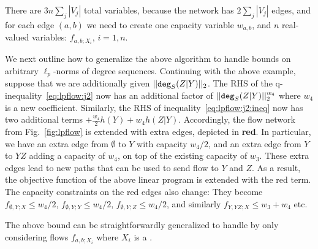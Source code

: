 \begin{example}
There are $3n\sum_j |V_j|$ total variables, because the network has
$2\sum_j|V_j|$ edges, and for each edge $(a,b)$ we need to create one
capacity variable $w_{a,b}$, and $n$ real-valued variables:
$f_{a,b;X_i}$, $i=1,n$.


% 
% 
% 

We next outline how to generalize the above algorithm to handle bounds
on arbitrary $\ell_p$-norms of degree sequences.  Continuing with the
above example, suppose that we are additionally given  $||\texttt{deg}_S(Z|Y)||_2$.  The RHS of the
q-inequality~\eqref{eq:lpflow:j2} now has an additional factor of
$||\texttt{deg}_S(Z|Y)||_2^{w_4}$ where $w_4$ is a new coefficient.
Similarly, the RHS of inequality~\eqref{eq:lpflow:j2:ineq} now has two
additional terms $+\frac{w_4}{2}h(Y) + w_4 h(Z|Y)$.  Accordingly, the
flow network from Fig.~\ref{fig:lpflow} is extended with extra
edges, depicted in \textbf{\color{red}red}.  In particular, we
have an extra edge from $\emptyset$ to $Y$ with capacity $w_4/2$, and
an extra edge from $Y$ to $YZ$ adding a capacity of $w_4$, on top of
the existing capacity of $w_3$.  These extra edges lead to new paths
that can be used to send flow to $Y$ and $Z$.  As a result, the
objective function of the above linear program is
extended with the red term.  The capacity constraints on the red
edges also change: They become $f_{\emptyset, Y; X} \leq w_4/2$,
$f_{\emptyset, Y; Y} \leq w_4/2$, $f_{\emptyset, Y; Z} \leq w_4/2$,
and similarly $f_{Y,YZ;X} \leq w_3+w_4$ etc.
\end{example}
The above bound can be straightforwardly generalized to handle \groupby by only considering flows $f_{a, b; X_i}$ where $X_i$ is a \groupby.

